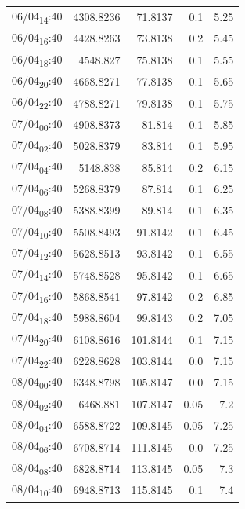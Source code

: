 \documentclass[11pt]{article}
\begin{document}
\begin{center}
\begin{tabular}{lrrrr}
06/04\textsubscript{14}:40 & 4308.8236 & 71.8137 & 0.1 & 5.25\\[0pt]
06/04\textsubscript{16}:40 & 4428.8263 & 73.8138 & 0.2 & 5.45\\[0pt]
06/04\textsubscript{18}:40 & 4548.827 & 75.8138 & 0.1 & 5.55\\[0pt]
06/04\textsubscript{20}:40 & 4668.8271 & 77.8138 & 0.1 & 5.65\\[0pt]
06/04\textsubscript{22}:40 & 4788.8271 & 79.8138 & 0.1 & 5.75\\[0pt]
07/04\textsubscript{00}:40 & 4908.8373 & 81.814 & 0.1 & 5.85\\[0pt]
07/04\textsubscript{02}:40 & 5028.8379 & 83.814 & 0.1 & 5.95\\[0pt]
07/04\textsubscript{04}:40 & 5148.838 & 85.814 & 0.2 & 6.15\\[0pt]
07/04\textsubscript{06}:40 & 5268.8379 & 87.814 & 0.1 & 6.25\\[0pt]
07/04\textsubscript{08}:40 & 5388.8399 & 89.814 & 0.1 & 6.35\\[0pt]
07/04\textsubscript{10}:40 & 5508.8493 & 91.8142 & 0.1 & 6.45\\[0pt]
07/04\textsubscript{12}:40 & 5628.8513 & 93.8142 & 0.1 & 6.55\\[0pt]
07/04\textsubscript{14}:40 & 5748.8528 & 95.8142 & 0.1 & 6.65\\[0pt]
07/04\textsubscript{16}:40 & 5868.8541 & 97.8142 & 0.2 & 6.85\\[0pt]
07/04\textsubscript{18}:40 & 5988.8604 & 99.8143 & 0.2 & 7.05\\[0pt]
07/04\textsubscript{20}:40 & 6108.8616 & 101.8144 & 0.1 & 7.15\\[0pt]
07/04\textsubscript{22}:40 & 6228.8628 & 103.8144 & 0.0 & 7.15\\[0pt]
08/04\textsubscript{00}:40 & 6348.8798 & 105.8147 & 0.0 & 7.15\\[0pt]
08/04\textsubscript{02}:40 & 6468.881 & 107.8147 & 0.05 & 7.2\\[0pt]
08/04\textsubscript{04}:40 & 6588.8722 & 109.8145 & 0.05 & 7.25\\[0pt]
08/04\textsubscript{06}:40 & 6708.8714 & 111.8145 & 0.0 & 7.25\\[0pt]
08/04\textsubscript{08}:40 & 6828.8714 & 113.8145 & 0.05 & 7.3\\[0pt]
08/04\textsubscript{10}:40 & 6948.8713 & 115.8145 & 0.1 & 7.4\\[0pt]
\end{tabular}
\end{center}
\end{document}
